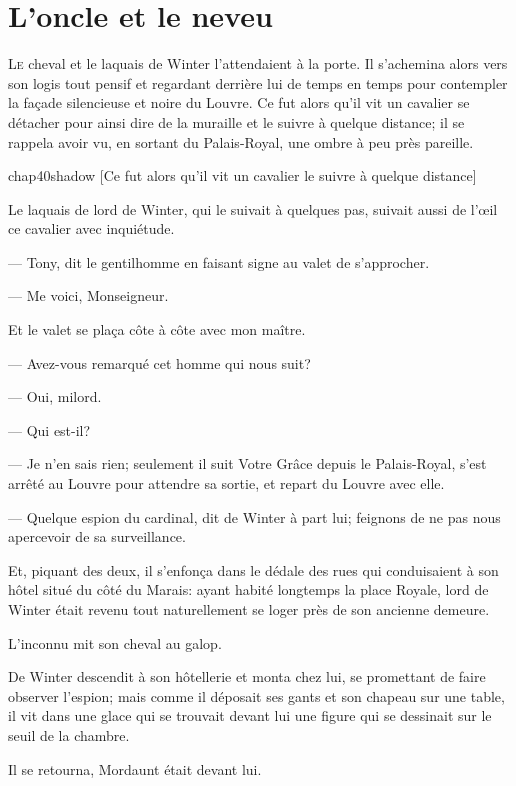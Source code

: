 \chapter{L'oncle et le neveu}

\lettrine{L}{e} cheval et le laquais de Winter l'attendaient à la porte. Il s'achemina alors vers son logis tout pensif et regardant derrière lui de temps en temps pour contempler la façade silencieuse et noire du Louvre. Ce fut alors qu'il vit un cavalier se détacher pour ainsi dire de la muraille et le suivre à quelque distance; il se rappela avoir vu, en sortant du Palais-Royal, une ombre à peu près pareille.

\begin{bwbigpic}
	[\basicscale] 
	{chap40shadow}
	[Ce fut alors qu'il vit un cavalier le suivre à quelque distance]
\end{bwbigpic}

Le laquais de lord de Winter, qui le suivait à quelques pas, suivait aussi de l'œil ce cavalier avec inquiétude.

— Tony, dit le gentilhomme en faisant signe au valet de s'approcher.

— Me voici, Monseigneur.

Et le valet se plaça côte à côte avec mon maître.

— Avez-vous remarqué cet homme qui nous suit?

— Oui, milord.

— Qui est-il?

— Je n'en sais rien; seulement il suit Votre Grâce depuis le Palais-Royal, s'est arrêté au Louvre pour attendre sa sortie, et repart du Louvre avec elle.

— Quelque espion du cardinal, dit de Winter à part lui; feignons de ne pas nous apercevoir de sa surveillance.

Et, piquant des deux, il s'enfonça dans le dédale des rues qui conduisaient à son hôtel situé du côté du Marais: ayant habité longtemps la place Royale, lord de Winter était revenu tout naturellement se loger près de son ancienne demeure.

L'inconnu mit son cheval au galop.

De Winter descendit à son hôtellerie et monta chez lui, se promettant de faire observer l'espion; mais comme il déposait ses gants et son chapeau sur une table, il vit dans une glace qui se trouvait devant lui une figure qui se dessinait sur le seuil de la chambre.

Il se retourna, Mordaunt était devant lui.

